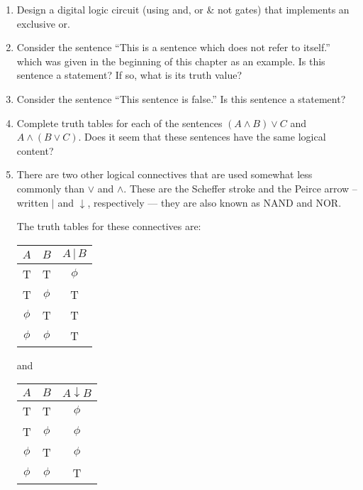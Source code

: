 \begin{enumerate}

\item Design a digital logic circuit (using and, or \& not gates) that 
implements an exclusive or.

\vspace{2in}

\item Consider the sentence 
``This is a sentence which does not refer to itself.''
which was given in the beginning of this chapter as an example.
Is this sentence a statement?  If so, what is its truth value?

\vspace{.5in}

\item Consider the sentence ``This sentence is false.''  Is this 
sentence a statement?

\vspace{.5in}

\item Complete truth tables for each of the sentences 
$(A \land B) \lor C$ and
$A \land (B \lor C)$.  Does it seem that these sentences have
the same logical content?

\vfill

\newpage

\item \label{ex:nand_nor} There are two other logical connectives that are
used somewhat less commonly than $\lor$ and $\land$.
These are the  Scheffer stroke and the 
Peirce arrow
-- written $\vert$ and $\downarrow$, respectively ---  they are 
also known as  NAND and  NOR.

\noindent The truth tables for these connectives are:
\medskip

\begin{tabular}{c|c|c}
$A$ & $B$ & $A \,\vert\, B$ \\ \hline
T & T & $\phi$ \\
T & $\phi$ & T \\
$\phi$ & T & T \\
$\phi$ & $\phi$ & T 
\end{tabular}
\hspace{.25 in} and \hspace{.25 in}
\begin{tabular}{c|c|c}
$A$ & $B$ & $A \downarrow B$ \\ \hline
T & T & $\phi$ \\
T & $\phi$ & $\phi$ \\
$\phi$ & T & $\phi$ \\
$\phi$ & $\phi$ & T 
\end{tabular}
\medskip


\end{enumerate}
